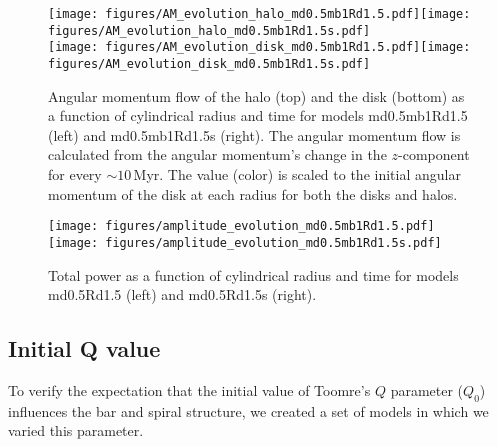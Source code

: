 \begin{figure*}
  \texttt{[image: figures/AM\_evolution\_halo\_md0.5mb1Rd1.5.pdf]}\texttt{[image: figures/AM\_evolution\_halo\_md0.5mb1Rd1.5s.pdf]}\\
  \texttt{[image: figures/AM\_evolution\_disk\_md0.5mb1Rd1.5.pdf]}\texttt{[image: figures/AM\_evolution\_disk\_md0.5mb1Rd1.5s.pdf]}\\
\caption{Angular momentum flow of the halo (top) and the disk (bottom) as a function of cylindrical radius and time for models md0.5mb1Rd1.5 (left) and md0.5mb1Rd1.5s (right). The angular momentum flow is calculated from the angular momentum's change in the $z$-component for every $\sim 10$\,Myr. The value (color) is scaled to the initial angular momentum of the disk at each radius for both the disks and halos.}
\label{fig:AM}
\end{figure*}


\begin{figure*}
  \texttt{[image: figures/amplitude\_evolution\_md0.5mb1Rd1.5.pdf]}
  \texttt{[image: figures/amplitude\_evolution\_md0.5mb1Rd1.5s.pdf]}\\
\caption{Total power as a function of cylindrical radius and time for models md0.5Rd1.5 (left) and md0.5Rd1.5s (right).}\label{fig:amplitude_ev}
\end{figure*}



\subsection{Initial Q value}

To verify the expectation that the initial value of Toomre's $Q$ parameter 
($Q_0$) influences the bar and spiral structure, we created a set of models in 
which we varied this parameter. 

